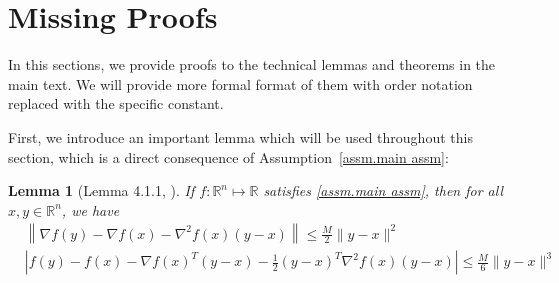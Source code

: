 \documentclass{article}
\theoremstyle{plain}
\newtheorem{lemma}[theorem]{Lemma}
\theoremstyle{definition}
\theoremstyle{remark}
\begin{document}
\section{Missing Proofs}\label{sec.proofs}
In this sections, we provide proofs to the technical lemmas and theorems in the main text. We will provide more formal format of them with order notation replaced with the specific constant.

First, we introduce an important lemma which will be used throughout this section, which is a direct consequence of Assumption~\ref{assm.main assm}:
\begin{lemma}[Lemma 4.1.1, \citet{nesterov_lectures_2018}]\label{lem.lipschitz}
    If \(f:\mathbb{R}^n \mapsto \mathbb{R}\) satisfies \autoref{assm.main assm}, then for all \(x,y\in \mathbb{R}^n\), we have
    \begin{subequations}
        \begin{align}
            \label{eq.first-order exp}
             & \left\|\nabla f(y)-\nabla f(x)-\nabla^{2} f(x)(y-x)\right\|                       \leq \frac{M}{2}\|y-x\|^{2} \\
            \label{eq.second-order exp}
             & \left|f(y)-f(x)-\nabla f(x)^T(y-x)-\frac{1}{2}(y-x)^T\nabla^{2} f(x)(y-x)\right|  \leq \frac{M}{6}\|y-x\|^{3}
        \end{align}
    \end{subequations}
\end{lemma}
\end{document}
